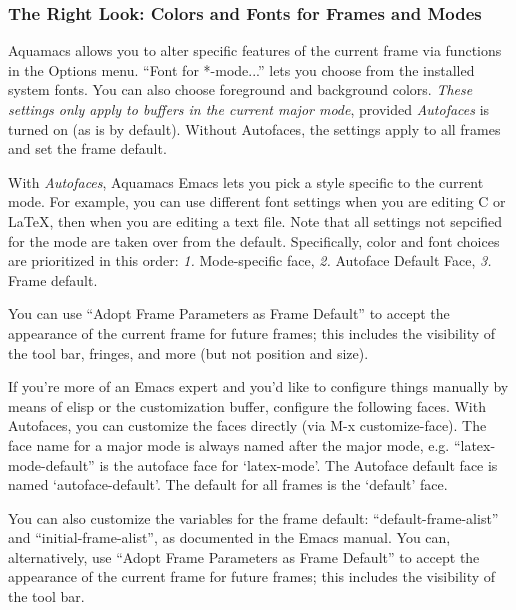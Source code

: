 \documentclass[11pt,letterpaper]{article}
\begin{document}
\subsubsection{The Right Look: Colors and Fonts for Frames and Modes}
\label{Look}
\label{frame-appearance-styles}
Aquamacs allows you to alter specific features of the current frame
via functions in the Options menu. ``Font for *-mode...'' lets you
choose from the installed system fonts.  You can also choose foreground and background colors.  \emph{ These settings only apply to buffers in the current major mode}, provided \emph{Autofaces} is turned on (as is by default).  Without Autofaces, the settings apply to all frames and set the frame default.  

With \emph{Autofaces}, Aquamacs Emacs lets you pick a style specific to the current
mode.  For example, you can use different font settings when you are editing
C or LaTeX, then when you are editing a text file.   Note that all settings not sepcified for the mode are taken over from the default. Specifically, color and font choices are prioritized in this order: {\it 1.} Mode-specific face, {\it 2.} Autoface Default Face, {\it 3.} Frame default.

You can use ``Adopt Frame Parameters as Frame Default'' to accept the appearance of the current frame for future frames; this includes the visibility of the tool bar, fringes, and more (but not position and size).

If you're more of an Emacs expert and you'd like to configure things manually by means of elisp or the customization buffer, configure the following faces. With Autofaces, you can customize the faces directly (via M-x customize-face).  The face name for a major mode is always named after the major mode, e.g. ``latex-mode-default'' is the autoface face for `latex-mode'.  The Autoface default face is named `autoface-default'. 
The default for all frames is the `default' face.

You can also customize the variables for the frame default: ``default-frame-alist'' and ``initial-frame-alist'', as documented in the Emacs manual.  You can, alternatively, use ``Adopt Frame Parameters as Frame Default'' to accept the appearance of the current frame for future frames; this includes the visibility of the tool bar.
\end{document}
